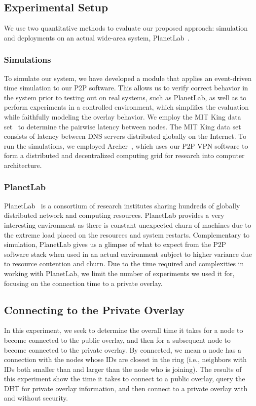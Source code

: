 \documentclass[conference]{IEEEtran}
\begin{document}
\subsection{Experimental Setup}
We use two quantitative methods to evaluate our proposed approach: simulation and deployments on an actual
wide-area system, PlanetLab~\cite{planetlab}.

\subsubsection{Simulations}
To simulate our system, we have developed a module that applies an event-driven
time simulation to our P2P software.  This allows us to verify correct behavior
in the system prior to testing out on real systems, such as PlanetLab, as well
as to perform experiments in a controlled environment, which simplifies the
evaluation while faithfully modeling the overlay behavior.  We employ the MIT
King data set~\cite{king_data} to determine the pairwise latency between nodes.
The MIT King data set consists of latency between DNS servers distributed
globally on the Internet.  To run the simulations, we employed
Archer~\cite{archer}, which uses our P2P VPN software to form a distributed and
decentralized computing grid for research into computer architecture.

\subsubsection{PlanetLab}
PlanetLab~\cite{planetlab} is a consortium of research institutes sharing
hundreds of globally distributed network and computing resources.  PlanetLab
provides a very interesting environment as there is constant unexpected churn
of machines due to the extreme load placed on the resources and system restarts.
Complementary to simulation, PlanetLab gives us a glimpse of what to expect from the
P2P software stack when used in an actual environment subject to higher variance due to resource contention and churn.
Due to the time required and complexities in
working with PlanetLab, we limit the number of experiments we used it for,
focusing on the connection time to a private overlay.

\subsection{Connecting to the Private Overlay}
In this experiment, we seek to determine the overall time
it takes for a node to become connected to the public overlay, and then for a
subsequent node to become connected to the private overlay.  By connected, we
mean a node has a connection with the nodes whose IDs are closest in the ring (i.e., neighbors with IDs both smaller
than and larger than the node who is joining).  The results of this experiment
show the time it takes to connect to a public overlay, query the DHT for private overlay
information, and then connect to a private overlay with and without security.
\end{document}

